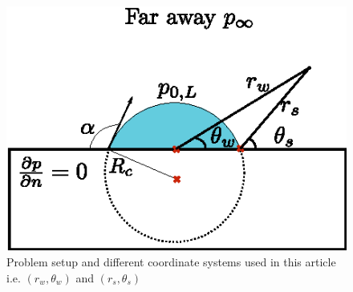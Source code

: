 \documentclass[final]{jfm}
\begin{document}
\begin{figure}
\centering
\includegraphics{figsv2/Fig1.eps}
\caption{Problem setup and different coordinate systems used in this article i.e. $(r_w,\theta_w)$ and $(r_s,\theta_s)$}
\label{fig:setup}
\end{figure}
\end{document}
